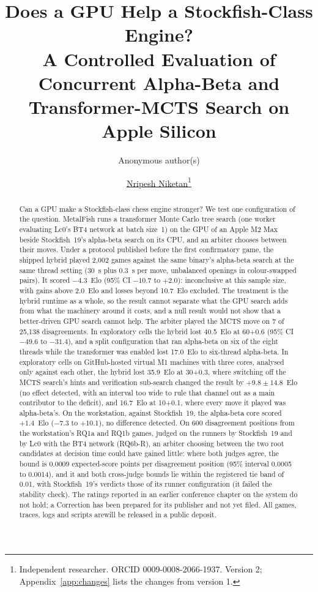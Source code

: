 \documentclass{article}
\title{Does a GPU Help a Stockfish-Class Engine?\\A Controlled Evaluation of Concurrent Alpha-Beta and Transformer-MCTS Search on Apple Silicon}
\author{Anonymous author(s)}
\author{
  \href{mailto:nripesh14@gmail.com}{Nripesh Niketan}\thanks{Independent researcher. ORCID 0009-0008-2066-1937. Version 2; Appendix~\ref{app:changes} lists the changes from version 1.}
}
\newif\iffinal
\newif\ifanon
\newcommand{\MF}{MetalFish}
\begin{document}
\maketitle

\begin{abstract}
Can a GPU make a Stockfish-class chess engine stronger? We test one configuration of the question.
\MF{} runs a transformer Monte Carlo tree search (one worker evaluating Lc0's BT4 network at batch
size~1) on the GPU of an Apple M2 Max beside Stockfish~19's alpha-beta search on its CPU, and an arbiter
chooses between their moves. Under a protocol published before the first confirmatory game, the shipped
hybrid played 2{,}002 games against the same binary's alpha-beta search at the same thread setting (30~s
plus 0.3~s per move, unbalanced openings in colour-swapped pairs). It scored $-4.3$~Elo (95\% CI
$-10.7$ to $+2.0$): inconclusive at this sample size, with gains above 2.0~Elo and losses beyond 10.7~Elo excluded. The treatment
is the hybrid runtime as a whole, so the result cannot separate what the GPU search adds from what the
machinery around it costs, and a null result would not show that a better-driven GPU search cannot
help. The arbiter played the MCTS move on 7 of 25{,}138 disagreements. In exploratory cells the hybrid
lost 40.5~Elo at 60+0.6 (95\% CI $-49.6$ to $-31.4$), and a split configuration that ran alpha-beta on
six of the eight threads while the transformer was enabled lost 17.0~Elo to six-thread alpha-beta. In
exploratory cells on GitHub-hosted virtual M1 machines with three cores, analysed only against each other, the hybrid lost
35.9~Elo at 30+0.3, where switching off
the MCTS search's hints and verification sub-search changed the result by $+9.8 \pm 14.8$~Elo (no effect detected, with an interval too wide to rule that channel out as a main contributor to the deficit), and 16.7~Elo at 10+0.1, where every move it played was alpha-beta's. On the workstation, against Stockfish~19, the alpha-beta core scored $+1.4$~Elo ($-7.3$ to $+10.1$),
no difference detected. On 600 disagreement positions from the workstation's RQ1a and RQ1b games, judged on the runners by Stockfish~19 and by Lc0 with the BT4 network (RQ6b-R), an arbiter choosing between the two root candidates at decision time could have gained little: where both judges agree, the bound is 0.0009 expected-score points per disagreement position (95\% interval 0.0005 to 0.0014), and it and both cross-judge bounds lie within the registered tie band of 0.01, with Stockfish~19's verdicts those of its runner configuration (it failed the stability check). The ratings
reported in an earlier conference chapter on the system do not hold; a Correction has been prepared for
its publisher and not yet filed. All games, traces, logs and scripts \iffinal\ifanon will be\else are\fi\else will be\fi{} released in a public deposit.
\end{abstract}
\end{document}
